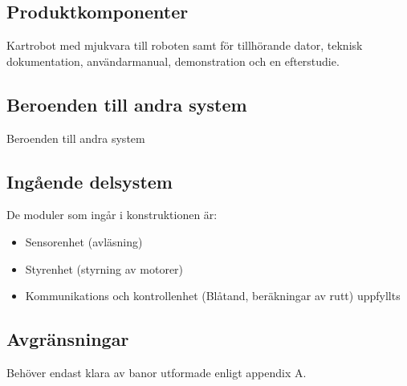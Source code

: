 \documentclass[a4paper,11pt]{article}
\begin{document}
\subsection{Produktkomponenter}
Kartrobot med mjukvara till roboten samt för tillhörande dator, teknisk dokumentation, användarmanual, demonstration och en efterstudie. 

\subsection{Beroenden till andra system }
Beroenden till andra system 

\subsection{Ingående delsystem}
De moduler som ingår i konstruktionen är:
\begin{itemize}
	\item Sensorenhet (avläsning) 
	\item Styrenhet (styrning av motorer) 
	\item Kommunikations och kontrollenhet (Blåtand, beräkningar av rutt)  uppfyllts 
\end{itemize}

\subsection{Avgränsningar}
Behöver endast klara av banor utformade enligt appendix A. 
\end{document}
